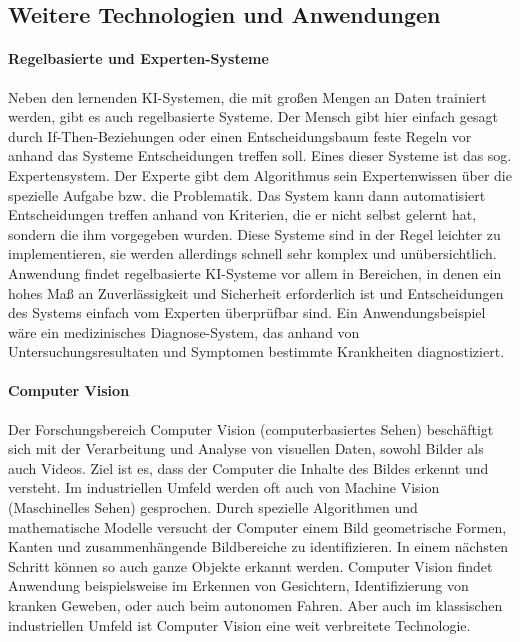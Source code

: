 \documentclass[a4paper,12pt, german]{report}
\begin{document}
\subsection{Weitere Technologien und Anwendungen}

\paragraph{Regelbasierte und Experten-Systeme}
Neben den lernenden KI-Systemen, die mit großen Mengen an Daten trainiert werden, gibt es auch regelbasierte Systeme. Der Mensch gibt hier einfach gesagt durch If-Then-Beziehungen oder einen Entscheidungsbaum feste Regeln vor anhand das Systeme Entscheidungen treffen soll. Eines dieser Systeme ist das sog. Expertensystem. Der Experte gibt dem Algorithmus sein Expertenwissen über die spezielle Aufgabe bzw. die Problematik. Das System kann dann automatisiert Entscheidungen treffen anhand von Kriterien, die er nicht selbst gelernt hat, sondern die ihm vorgegeben wurden. Diese Systeme sind in der Regel leichter zu implementieren, sie werden allerdings schnell sehr komplex und unübersichtlich.
Anwendung findet regelbasierte KI-Systeme vor allem in Bereichen, in denen ein hohes Maß an Zuverlässigkeit und Sicherheit erforderlich ist und Entscheidungen des Systems einfach vom Experten überprüfbar sind. 
Ein Anwendungsbeispiel wäre ein medizinisches Diagnose-System, das anhand von Untersuchungsresultaten und Symptomen bestimmte Krankheiten diagnostiziert.

\paragraph{Computer Vision}

Der Forschungsbereich Computer Vision (computerbasiertes Sehen) beschäftigt sich mit der Verarbeitung und Analyse von visuellen Daten, sowohl Bilder als auch Videos. Ziel ist es, dass der Computer die Inhalte des Bildes erkennt und versteht. Im industriellen Umfeld werden oft auch von Machine Vision (Maschinelles Sehen) gesprochen. 
Durch spezielle Algorithmen und mathematische Modelle versucht der Computer einem Bild geometrische Formen, Kanten und zusammenhängende Bildbereiche zu identifizieren. In einem nächsten Schritt können so auch ganze Objekte erkannt werden. 
Computer Vision findet Anwendung beispielsweise im Erkennen von Gesichtern, Identifizierung von kranken Geweben, oder auch beim autonomen Fahren. Aber auch im klassischen industriellen Umfeld ist Computer Vision eine weit verbreitete Technologie.
\end{document}
